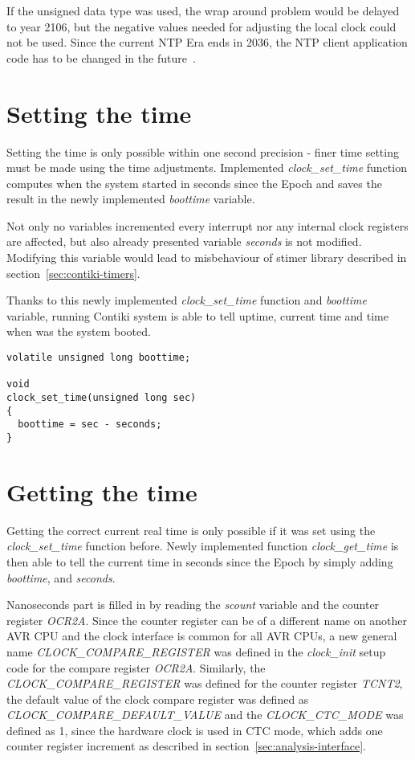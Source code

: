If the unsigned data type was used, the wrap around problem would be delayed to year 2106,
but the negative values needed for adjusting the local clock could not be used.
Since the current NTP Era ends in 2036,
the NTP client application code has to be changed in the future~\cite{ntp-y2k}.

\section{Setting the time}
Setting the time is only possible within one second precision -
finer time setting must be made using the time adjustments.
Implemented {\it{clock\_set\_time}} function computes when the system started
in seconds since the Epoch and saves the result in the newly implemented {\it{boottime}} variable.

Not only no variables incremented every interrupt nor any internal clock registers
are affected, but also already presented variable {\it{seconds}} is not modified.
Modifying this variable would lead to misbehaviour of stimer library
described in section~\ref{sec:contiki-timers}.

Thanks to this newly implemented {\it{clock\_set\_time}} function and {\it{boottime}} variable,
running Contiki system is able to tell uptime, current time and time when was the system booted.
\begin{lstlisting}
volatile unsigned long boottime;

void
clock_set_time(unsigned long sec)
{
  boottime = sec - seconds;
}
\end{lstlisting}

\section{Getting the time}
Getting the correct current real time is only possible if it was set using
the {\it{clock\_set\_time}} function before.
Newly implemented function {\it{clock\_get\_time}} is then able to tell the
current time in seconds since the Epoch by simply adding {\it{boottime}},
and {\it{seconds}}.

Nanoseconds part is filled in by reading the {\it{scount}} variable and the counter register {\it{OCR2A}}.
Since the counter register can be of a different name on another AVR CPU
and the clock interface is common for all AVR CPUs,
a new general name {\it{CLOCK\_COMPARE\_REGISTER}} was defined in the {\it{clock\_init}} setup code
for the compare register {\it{OCR2A}}.
Similarly, the {\it{CLOCK\_COMPARE\_REGISTER}} was defined for the counter register {\it{TCNT2}},
the default value of the clock compare register was defined as {\it{CLOCK\_COMPARE\_DEFAULT\_VALUE}}
and the {\it{CLOCK\_CTC\_MODE}} was defined as 1, since the hardware clock is used in CTC mode,
which adds one counter register increment as described in section~\ref{sec:analysis-interface}.

